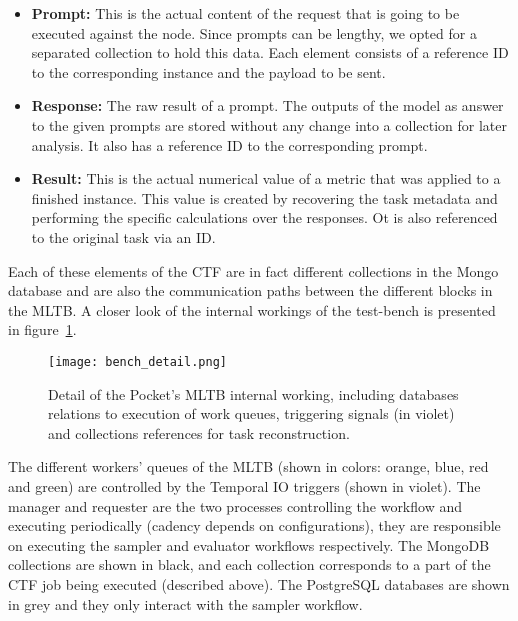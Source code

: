 \begin{itemize}
\begin{itemize}
    \end{itemize}
    \item \textbf{Prompt:} This is the actual content of the request that is going to be executed against the node. Since prompts can be lengthy, we opted for a separated collection to hold this data. Each element consists of a reference ID to the corresponding instance and the payload to be sent.
    \item \textbf{Response:} The raw result of a prompt. The outputs of the model as answer to the given prompts are stored without any change into a collection for later analysis. It also has a reference ID to the corresponding prompt.
    \item \textbf{Result:} This is the actual numerical value of a metric that was applied to a finished instance. This value is created by recovering the task metadata and performing the specific calculations over the responses. Ot is also referenced to the original task via an ID.
\end{itemize}

Each of these elements of the \gls{CTF} are in fact different collections in the Mongo database and are also the communication paths between the different blocks in the \gls{MLTB}. A closer look of the internal workings of the test-bench is presented in figure~\ref{fig:bench_detail}.
\begin{figure}[H]
    \centering
    \texttt{[image: bench\_detail.png]}
    \caption{Detail of the Pocket's \gls{MLTB} internal working, including databases relations to execution of work queues, triggering signals (in violet) and collections references for task reconstruction.}
    \label{fig:bench_detail}
\end{figure} 
The different workers' queues of the \gls{MLTB} (shown in colors: orange, blue, red and green) are controlled by the Temporal IO triggers (shown in violet). The manager and requester are the two processes controlling the workflow and executing periodically (cadency depends on configurations), they are responsible on executing the sampler and evaluator workflows respectively. The MongoDB collections are shown in black, and each collection corresponds to a part of the \gls{CTF} job being executed (described above). The PostgreSQL databases are shown in grey and they only interact with the sampler workflow.

